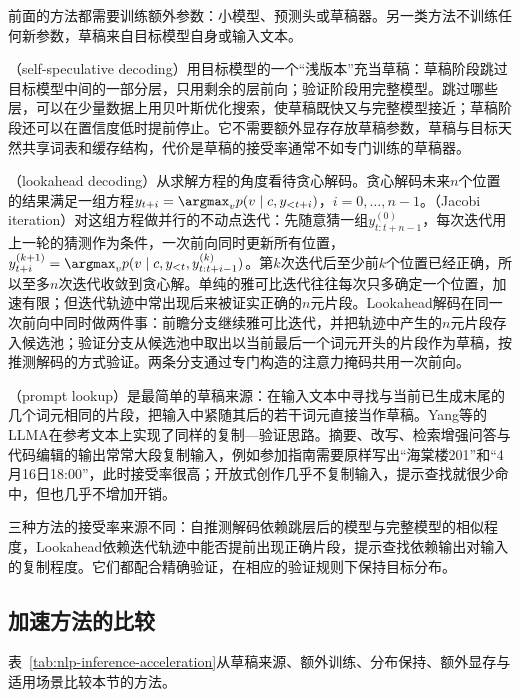 前面的方法都需要训练额外参数：小模型、预测头或草稿器。另一类方法不训练任何新参数，草稿来自目标模型自身或输入文本。

（self-speculative decoding）用目标模型的一个“浅版本”充当草稿：草稿阶段跳过目标模型中间的一部分层，只用剩余的层前向；验证阶段用完整模型。跳过哪些层，可以在少量数据上用贝叶斯优化搜索，使草稿既快又与完整模型接近；草稿阶段还可以在置信度低时提前停止。它不需要额外显存存放草稿参数，草稿与目标天然共享词表和缓存结构，代价是草稿的接受率通常不如专门训练的草稿器。

（lookahead decoding）从求解方程的角度看待贪心解码。贪心解码未来$n$个位置的结果满足一组方程$y_{t+i}=\argmax_vp(v\mid c,y_{<t+i})$，$i=0,\ldots,n-1$。（Jacobi iteration）对这组方程做并行的不动点迭代：先随意猜一组$y^{(0)}_{t:t+n-1}$，每次迭代用上一轮的猜测作为条件，一次前向同时更新所有位置，$y^{(k+1)}_{t+i}=\argmax_vp(v\mid c,y_{<t},y^{(k)}_{t:t+i-1})$。第$k$次迭代后至少前$k$个位置已经正确，所以至多$n$次迭代收敛到贪心解。单纯的雅可比迭代往往每次只多确定一个位置，加速有限；但迭代轨迹中常出现后来被证实正确的$n$元片段。Lookahead解码在同一次前向中同时做两件事：前瞻分支继续雅可比迭代，并把轨迹中产生的$n$元片段存入候选池；验证分支从候选池中取出以当前最后一个词元开头的片段作为草稿，按推测解码的方式验证。两条分支通过专门构造的注意力掩码共用一次前向。

（prompt lookup）是最简单的草稿来源：在输入文本中寻找与当前已生成末尾的几个词元相同的片段，把输入中紧随其后的若干词元直接当作草稿。Yang等的LLMA在参考文本上实现了同样的复制—验证思路。摘要、改写、检索增强问答与代码编辑的输出常常大段复制输入，例如参加指南需要原样写出“海棠楼201”和“4月16日18:00”，此时接受率很高；开放式创作几乎不复制输入，提示查找就很少命中，但也几乎不增加开销。

三种方法的接受率来源不同：自推测解码依赖跳层后的模型与完整模型的相似程度，Lookahead依赖迭代轨迹中能否提前出现正确片段，提示查找依赖输出对输入的复制程度。它们都配合精确验证，在相应的验证规则下保持目标分布。

\subsection{加速方法的比较}
\label{sec:nlp-inference-acceleration-comparison}

表~\ref{tab:nlp-inference-acceleration}从草稿来源、额外训练、分布保持、额外显存与适用场景比较本节的方法。

